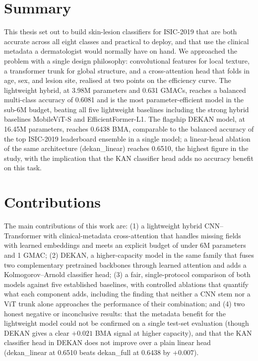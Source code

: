 \section{Summary}

This thesis set out to build skin-lesion classifiers for ISIC-2019 that are both
accurate across all eight classes and practical to deploy, and that use the
clinical metadata a dermatologist would normally have on hand. We approached the
problem with a single design philosophy: convolutional features for local
texture, a transformer trunk for global structure, and a cross-attention head
that folds in age, sex, and lesion site, realised at two points on the
efficiency curve. The lightweight hybrid, at 3.98M parameters and 0.631 GMACs,
reaches a balanced multi-class accuracy of 0.6081 and is the most
parameter-efficient model in the sub-6M budget, beating all five lightweight
baselines including the strong hybrid baselines MobileViT-S and
EfficientFormer-L1. The flagship DEKAN model, at 16.45M parameters, reaches 0.6438 BMA, comparable
to the balanced accuracy of the top ISIC-2019 leaderboard ensemble in a single
model; a linear-head ablation of the same architecture (dekan\_linear) reaches
0.6510, the highest figure in the study, with the implication that the KAN
classifier head adds no accuracy benefit on this task.

\section{Contributions}

The main contributions of this work are: (1) a lightweight hybrid
CNN--Transformer with clinical-metadata cross-attention that handles missing
fields with learned embeddings and meets an explicit budget of under 6M
parameters and 1 GMAC; (2) DEKAN, a higher-capacity model in the same family
that fuses two complementary pretrained backbones through learned attention and
adds a Kolmogorov--Arnold classifier head; (3) a fair, single-protocol
comparison of both models against five established baselines, with controlled
ablations that quantify what each component adds, including the finding that
neither a CNN stem nor a ViT trunk alone approaches the performance of their
combination; and (4) two honest negative or inconclusive results: that the
metadata benefit for the lightweight model could not be confirmed on a single
test-set evaluation (though DEKAN gives a clear $+0.021$ BMA signal at higher
capacity), and that the KAN classifier head in DEKAN does not improve over a
plain linear head (dekan\_linear at 0.6510 beats dekan\_full at 0.6438 by
$+0.007$).

